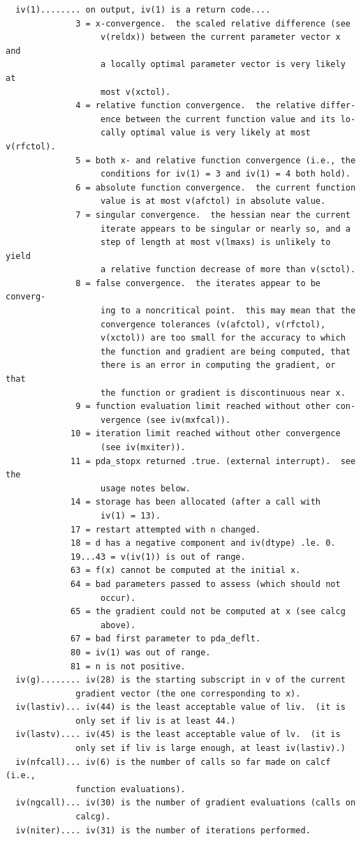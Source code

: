 \documentclass[11pt,twoside]{article}
\begin{document}
\begin{verbatim}
  iv(1)........ on output, iv(1) is a return code....
              3 = x-convergence.  the scaled relative difference (see
                   v(reldx)) between the current parameter vector x and
                   a locally optimal parameter vector is very likely at
                   most v(xctol).
              4 = relative function convergence.  the relative differ-
                   ence between the current function value and its lo-
                   cally optimal value is very likely at most v(rfctol).
              5 = both x- and relative function convergence (i.e., the
                   conditions for iv(1) = 3 and iv(1) = 4 both hold).
              6 = absolute function convergence.  the current function
                   value is at most v(afctol) in absolute value.
              7 = singular convergence.  the hessian near the current
                   iterate appears to be singular or nearly so, and a
                   step of length at most v(lmaxs) is unlikely to yield
                   a relative function decrease of more than v(sctol).
              8 = false convergence.  the iterates appear to be converg-
                   ing to a noncritical point.  this may mean that the
                   convergence tolerances (v(afctol), v(rfctol),
                   v(xctol)) are too small for the accuracy to which
                   the function and gradient are being computed, that
                   there is an error in computing the gradient, or that
                   the function or gradient is discontinuous near x.
              9 = function evaluation limit reached without other con-
                   vergence (see iv(mxfcal)).
             10 = iteration limit reached without other convergence
                   (see iv(mxiter)).
             11 = pda_stopx returned .true. (external interrupt).  see the
                   usage notes below.
             14 = storage has been allocated (after a call with
                   iv(1) = 13).
             17 = restart attempted with n changed.
             18 = d has a negative component and iv(dtype) .le. 0.
             19...43 = v(iv(1)) is out of range.
             63 = f(x) cannot be computed at the initial x.
             64 = bad parameters passed to assess (which should not
                   occur).
             65 = the gradient could not be computed at x (see calcg
                   above).
             67 = bad first parameter to pda_deflt.
             80 = iv(1) was out of range.
             81 = n is not positive.
  iv(g)........ iv(28) is the starting subscript in v of the current
              gradient vector (the one corresponding to x).
  iv(lastiv)... iv(44) is the least acceptable value of liv.  (it is
              only set if liv is at least 44.)
  iv(lastv).... iv(45) is the least acceptable value of lv.  (it is
              only set if liv is large enough, at least iv(lastiv).)
  iv(nfcall)... iv(6) is the number of calls so far made on calcf (i.e.,
              function evaluations).
  iv(ngcall)... iv(30) is the number of gradient evaluations (calls on
              calcg).
  iv(niter).... iv(31) is the number of iterations performed.
 

\end{verbatim}
\end{document}
